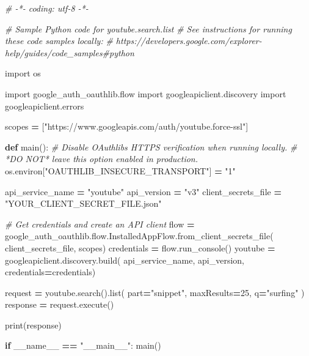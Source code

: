 \documentclass[
]{book}
\newenvironment{Shaded}{\begin{snugshade}}{\end{snugshade}}
\newcommand{\BuiltInTok}[1]{#1}
\newcommand{\CommentTok}[1]{\textcolor[rgb]{0.56,0.35,0.01}{\textit{#1}}}
\newcommand{\ControlFlowTok}[1]{\textcolor[rgb]{0.13,0.29,0.53}{\textbf{#1}}}
\newcommand{\DecValTok}[1]{\textcolor[rgb]{0.00,0.00,0.81}{#1}}
\newcommand{\ImportTok}[1]{#1}
\newcommand{\KeywordTok}[1]{\textcolor[rgb]{0.13,0.29,0.53}{\textbf{#1}}}
\newcommand{\NormalTok}[1]{#1}
\newcommand{\OperatorTok}[1]{\textcolor[rgb]{0.81,0.36,0.00}{\textbf{#1}}}
\newcommand{\StringTok}[1]{\textcolor[rgb]{0.31,0.60,0.02}{#1}}
\newcommand{\VariableTok}[1]{\textcolor[rgb]{0.00,0.00,0.00}{#1}}
\begin{document}
\begin{Shaded}
\begin{Highlighting}[]
\CommentTok{\# {-}*{-} coding: utf{-}8 {-}*{-}}

\CommentTok{\# Sample Python code for youtube.search.list}
\CommentTok{\# See instructions for running these code samples locally:}
\CommentTok{\# https://developers.google.com/explorer{-}help/guides/code\_samples\#python}

\ImportTok{import}\NormalTok{ os}

\ImportTok{import}\NormalTok{ google\_auth\_oauthlib.flow}
\ImportTok{import}\NormalTok{ googleapiclient.discovery}
\ImportTok{import}\NormalTok{ googleapiclient.errors}

\NormalTok{scopes }\OperatorTok{=}\NormalTok{ [}\StringTok{"https://www.googleapis.com/auth/youtube.force{-}ssl"}\NormalTok{]}

\KeywordTok{def}\NormalTok{ main():}
    \CommentTok{\# Disable OAuthlib\textquotesingle{}s HTTPS verification when running locally.}
    \CommentTok{\# *DO NOT* leave this option enabled in production.}
\NormalTok{    os.environ[}\StringTok{"OAUTHLIB\_INSECURE\_TRANSPORT"}\NormalTok{] }\OperatorTok{=} \StringTok{"1"}

\NormalTok{    api\_service\_name }\OperatorTok{=} \StringTok{"youtube"}
\NormalTok{    api\_version }\OperatorTok{=} \StringTok{"v3"}
\NormalTok{    client\_secrets\_file }\OperatorTok{=} \StringTok{"YOUR\_CLIENT\_SECRET\_FILE.json"}

    \CommentTok{\# Get credentials and create an API client}
\NormalTok{    flow }\OperatorTok{=}\NormalTok{ google\_auth\_oauthlib.flow.InstalledAppFlow.from\_client\_secrets\_file(}
\NormalTok{        client\_secrets\_file, scopes)}
\NormalTok{    credentials }\OperatorTok{=}\NormalTok{ flow.run\_console()}
\NormalTok{    youtube }\OperatorTok{=}\NormalTok{ googleapiclient.discovery.build(}
\NormalTok{        api\_service\_name, api\_version, credentials}\OperatorTok{=}\NormalTok{credentials)}

\NormalTok{    request }\OperatorTok{=}\NormalTok{ youtube.search().}\BuiltInTok{list}\NormalTok{(}
\NormalTok{        part}\OperatorTok{=}\StringTok{"snippet"}\NormalTok{,}
\NormalTok{        maxResults}\OperatorTok{=}\DecValTok{25}\NormalTok{,}
\NormalTok{        q}\OperatorTok{=}\StringTok{"surfing"}
\NormalTok{    )}
\NormalTok{    response }\OperatorTok{=}\NormalTok{ request.execute()}

    \BuiltInTok{print}\NormalTok{(response)}

\ControlFlowTok{if} \VariableTok{\_\_name\_\_} \OperatorTok{==} \StringTok{"\_\_main\_\_"}\NormalTok{:}
\NormalTok{    main()}
\end{Highlighting}
\end{Shaded}
\end{document}
